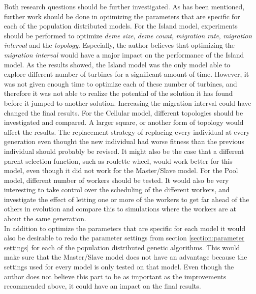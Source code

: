 \noindent Both research questions should be further investigated. As has been mentioned, further work should be done in optimizing the parameters that are specific for each of the population distributed models. For the Island model, experiments should be performed to optimize \textit{deme size}, \textit{deme count}, \textit{migration rate}, \textit{migration interval} and the \textit{topology}. Especially, the author believes that optimizing the \textit{migration interval} would have a major impact on the performance of the Island model. As the results showed, the Island model was the only model able to explore different number of turbines for a significant amount of time. However, it was not given enough time to optimize each of these number of turbines, and therefore it was not able to realize the potential of the solution it has found before it jumped to another solution. Increasing the migration interval could have changed the final results. For the Cellular model, different topologies should be investigated and compared. A larger square, or another form of topology would affect the results. The replacement strategy of replacing every individual at every generation even thought the new individual had worse fitness than the previous individual should probably be revised. It might also be the case that a different parent selection function, such as roulette wheel, would work better for this model, even though it did not work for the Master/Slave model. For the Pool model, different number of workers should be tested. It would also be very interesting to take control over the scheduling of the different workers, and investigate the effect of letting one or more of the workers to get far ahead of the others in evolution and compare this to simulations where the workers are at about the same generation. \\


\noindent In addition to optimize the parameters that are specific for each model it would also be desirable to redo the parameter settings from section \ref{section:parameter settings} for each of the population distributed genetic algorithms. This would make sure that the Master/Slave model does not have an advantage because the settings used for every model is only tested on that model. Even though the author does not believe this part to be as important as the improvements  recommended above, it could have an impact on the final results. \\


